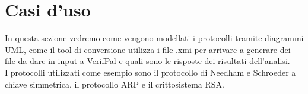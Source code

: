 \section{Casi d'uso}
\label{sez:use}

In questa sezione vedremo come vengono modellati i protocolli tramite diagrammi UML, come il tool di conversione utilizza i file .xmi per arrivare a generare dei file da dare in input a VerifPal e quali sono le risposte dei risultati dell'analisi.\\
I protocolli utilizzati come esempio sono il protocollo di Needham e Schroeder a chiave simmetrica, il protocollo ARP e il crittosistema RSA.\\



